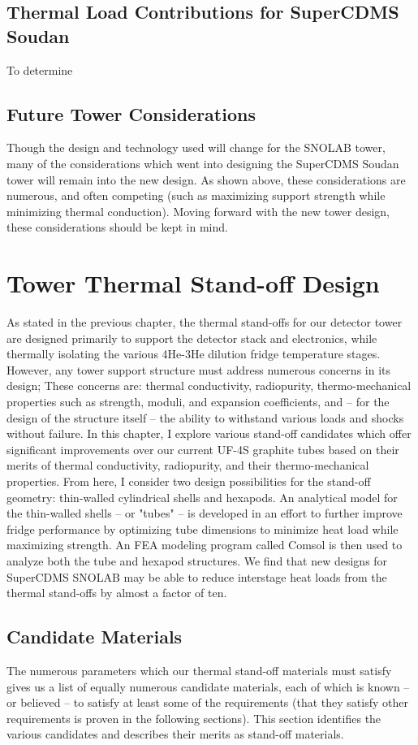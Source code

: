 \documentclass{report}
\begin{document}
\section{Thermal Load Contributions for SuperCDMS Soudan}

To determine
\section{Future Tower Considerations}
Though the design and technology used will change for the SNOLAB tower, many of the considerations which went into designing the SuperCDMS Soudan tower will remain into the new design. As shown above, these considerations are numerous, and often competing (such as maximizing support strength while minimizing thermal conduction). Moving forward with the new tower design, these considerations should be kept in mind.


\chapter{Tower Thermal Stand-off Design}

As stated in the previous chapter, the thermal stand-offs for our detector tower are designed primarily to support the detector stack and electronics, while thermally isolating the various 4He-3He dilution fridge temperature stages. However, any tower support structure must address numerous concerns in its design; These concerns are: thermal conductivity, radiopurity, thermo-mechanical properties such as strength, moduli, and expansion coefficients, and -- for the design of the structure itself -- the ability to withstand various loads and shocks without failure. In this chapter, I explore various stand-off candidates which offer significant improvements over our current UF-4S graphite tubes based on their merits of thermal conductivity, radiopurity, and their thermo-mechanical properties. From here, I consider two design possibilities for the stand-off geometry: thin-walled cylindrical shells and hexapods. An analytical model for the thin-walled shells -- or "tubes" -- is developed in an effort to further improve fridge performance by optimizing tube dimensions to minimize heat load while maximizing strength. An FEA modeling program called Comsol is then used to analyze both the tube and hexapod structures. We find that new designs for SuperCDMS SNOLAB may be able to reduce interstage heat loads from the thermal stand-offs by almost a factor of ten.

\section{Candidate Materials}
The numerous parameters which our thermal stand-off materials must satisfy gives us a list of equally numerous candidate materials, each of which is known -- or believed -- to satisfy at least some of the requirements (that they satisfy other requirements is proven in the following sections). This section identifies the various candidates and describes their merits as stand-off materials.
\end{document}
